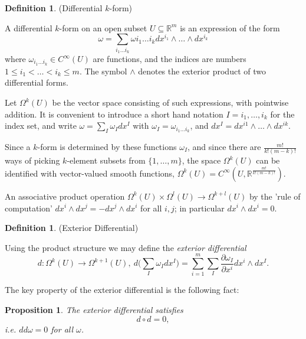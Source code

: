 \documentclass{article}
\newtheorem{proposition}{Proposition}[theorem]
\theoremstyle{definition}
\newtheorem{defn}[theorem]{Definition}
\newenvironment{definition}
  {\vspace{8pt}\begin{mdframed}[backgroundcolor=blueish]\begin{defn}}
  {\end{defn}\end{mdframed}\vspace{4pt}}
\begin{document}
\begin{definition} (Differential $k$-form)

A differential $k$-form on an open subset $U \subseteq \mathbb R^m$ is an expression of the form 
\[
    \omega = \sum_{i_1 \dots i_k} \omega i_1\dots i_k dx^{i_1} \wedge \dots \wedge  dx^{i_k}
\] 
where $\omega_{i_1\dots i_k} \in C^\infty(U)$ are functions, and the indices are numbers $1 \leq i_1 < \dots < i_k \leq m$. The symbol $\wedge$ denotes the exterior product of two differential forms.
\end{definition}

Let $\Omega^k (U)$ be the vector space consisting of such expressions, with pointwise addition. It is convenient to introduce a short hand notation $I = {i_1,\dots,i_k}$ for the index set, and write $\omega = \sum_I \omega_I dx^I$ with $\omega_I = \omega_{i_1 \dots i_k}$, and $dx^I = dx^{i1} \wedge \dots \wedge dx^{ik}$.

Since a $k$-form is determined by these functions $\omega_I$, and since there are $\frac{m!}{k!(m-k)!}$ ways of picking $k$-element subsets from $\{1,\dots,m\}$, the space $\Omega^k (U)$ can be identified with vector-valued smooth functions, $\Omega^k (U) = C^\infty (U, \mathbb R ^{\frac{m!}{k!(m-k)!}})$.

An associative product operation $\Omega^k (U) \times \Omega^l (U) \rightarrow \Omega^{k+l} (U)$ by the 'rule of computation' $dx^i \wedge d x^j = -dx^j \wedge d x^i$ for all $i, j$;  in particular $dx^i \wedge dx^i = 0$.

\begin{definition}(Exterior Differential)

Using the product structure we may define the \textit{exterior differential}
\[
    d : \Omega^k (U) \rightarrow \Omega^{k+1}(U),  \ d \bigg ( \sum_I \omega_I dx^I \bigg ) = \sum_{i=1}^m \sum_I \frac{\partial \omega_I}{\partial x^i} dx^i \wedge dx^I.
\]
\end{definition}

The key property of the exterior differential is the following fact:
\begin{proposition}
The exterior differential satisfies
\[
    d \circ d = 0,
\]
i.e. $dd\omega = 0$ for all $\omega$.
\end{proposition}
\end{document}

